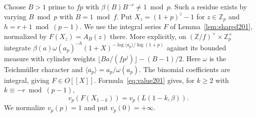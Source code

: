 \documentclass[a4paper,11pt]{article}
\theoremstyle{definition}
\theoremstyle{remark}
\newcommand{\ZZ}{\mathbb Z}\newcommand{\ord}{\operatorname{ord}}
\numberwithin{equation}{section}
\begin{document}
Choose \(B>1\) prime to \(fp\) with \(\beta(B)B^{-r}\ne1\bmod p\).
Such a residue exists by varying \(B\bmod p\) with \(B=1\bmod f\).
Put \(X_z=(1+p)^z-1\) for \(z\in\ZZ_p\) and \(h=r+1\bmod(p-1)\).
We use the integral series \(F\) of Lemma~\ref{lem:shared201},
normalized by \(F(X_z)=A_B(z)\) there. More explicitly, on
\((\ZZ/f)^\times\times\ZZ_p^\times\) integrate
\(\beta(a)\omega(a_p)^{-h}(1+X)^{-\log\langle a_p\rangle/\log(1+p)}\)
against its bounded measure with cylinder weights
\(\lfloor Ba/(fp^j)\rfloor-(B-1)/2\).
Here \(\omega\) is the Teichm\"uller character and
\(\langle a_p\rangle=a_p/\omega(a_p)\). The binomial coefficients
are integral, giving \(F\in O[[X]]\). Formula~\eqref{eq:value201}
gives, for \(k\ge2\) with \(k\equiv-r\bmod(p-1)\),
\[
 v_p(F(X_{1-k}))=v_p(L(1-k,\beta)).
\]
We normalize \(v_p(p)=1\) and put \(v_p(0)=+\infty\).
\end{document}
